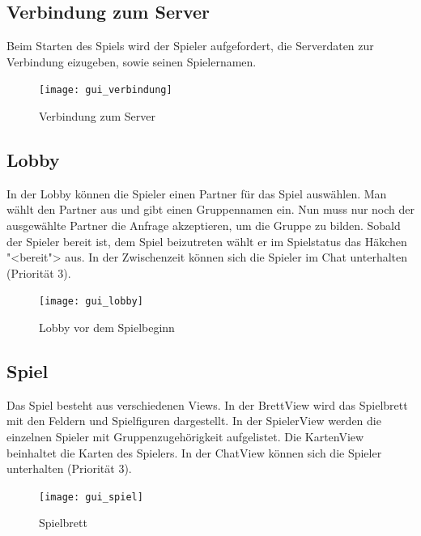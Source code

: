 \documentclass[12pt,halfparskip]{scrartcl}
\begin{document}
\subsection{Verbindung zum Server} %
\label{externes_design_verbindung}

Beim Starten des Spiels wird der Spieler aufgefordert, die Serverdaten zur Verbindung eizugeben, sowie seinen Spielernamen.

\begin{figure}[h]
	\centering
	\texttt{[image: gui\_verbindung]}
	\caption{Verbindung zum Server}
	\label{fig:gui_verbindung}
\end{figure}

\clearpage

\subsection{Lobby} %
\label{externes_design_lobby}

In der Lobby können die Spieler einen Partner für das Spiel auswählen. Man wählt den Partner aus und gibt einen Gruppennamen ein. Nun muss nur noch der ausgewählte Partner die Anfrage akzeptieren, um die Gruppe zu bilden. Sobald der Spieler bereit ist, dem Spiel beizutreten wählt er im Spielstatus das Häkchen "<bereit"> aus. In der Zwischenzeit können sich die Spieler im Chat unterhalten (Priorität 3).

\begin{figure}[h]
	\centering
	\texttt{[image: gui\_lobby]}
	\caption{Lobby vor dem Spielbeginn}
	\label{fig:gui_lobby}
\end{figure}

\clearpage

\subsection{Spiel} %
\label{externes_design_spielbrett}

Das Spiel besteht aus verschiedenen Views. In der BrettView wird das Spielbrett mit den Feldern und Spielfiguren dargestellt. In der SpielerView werden die einzelnen Spieler mit Gruppenzugehörigkeit aufgelistet. Die KartenView beinhaltet die Karten des Spielers. In der ChatView können sich die Spieler unterhalten (Priorität 3).

\begin{figure}[h]
	\centering
	\texttt{[image: gui\_spiel]}
	\caption{Spielbrett}
	\label{fig:gui_spiel}
\end{figure}
\end{document}
